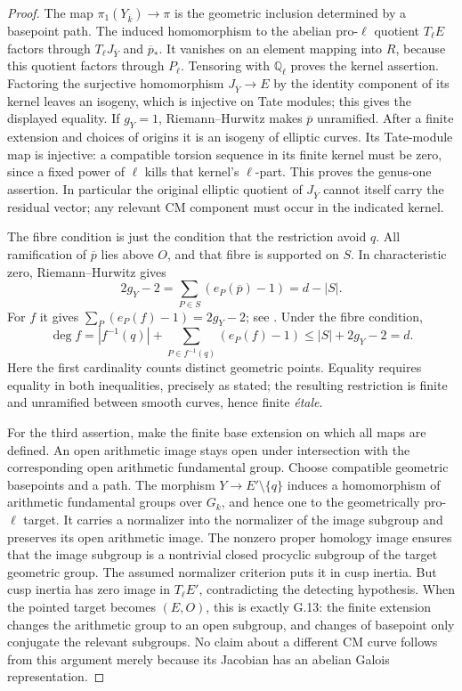 \begin{proof}
The map $\pi_1(Y_{\overline k})\to\pi$ is the geometric
inclusion determined by a basepoint path. The induced homomorphism
to the abelian pro-$\ell$ quotient $T_\ell E$ factors through
$T_\ell J_{\overline Y}$ and $\overline p_*$. It vanishes on
an element mapping into $R$, because this quotient factors
through $P_\ell$. Tensoring with $\mathbb Q_\ell$ proves the
kernel assertion. Factoring
the surjective homomorphism $J_{\overline Y}\to E$ by the
identity component of its kernel leaves an isogeny, which is
injective on Tate modules; this gives the displayed equality.
If $g_Y=1$, Riemann--Hurwitz makes $\overline p$ unramified.
After a finite extension and choices of origins it is an isogeny
of elliptic curves. Its Tate-module map is injective: a compatible
torsion sequence in its finite kernel must be zero, since a
fixed power of $\ell$ kills that kernel's $\ell$-part. This
proves the genus-one assertion. In particular the original
elliptic quotient of $J_{\overline Y}$ cannot itself carry the
residual vector; any relevant CM component must occur in the
indicated kernel.

The fibre condition is just the condition that the restriction
avoid $q$. All ramification of $\overline p$ lies above $O$,
and that fibre is supported on $S$. In characteristic zero,
Riemann--Hurwitz gives
\[
 2g_Y-2=\sum_{P\in S}(e_P(\overline p)-1)=d-|S|.
\]
For $f$ it gives $\sum_P(e_P(f)-1)=2g_Y-2$; see
\citet[\S53.12, Lemmas 53.12.2 and 53.12.4]{GStacksRiemannHurwitz}.
Under the fibre condition,
\[
 \deg f
   =|f^{-1}(q)|+\sum_{P\in f^{-1}(q)}(e_P(f)-1)
   \le |S|+2g_Y-2=d.
\]
Here the first cardinality counts distinct geometric points.
Equality requires equality in both inequalities, precisely as
stated; the resulting restriction is finite and unramified
between smooth curves, hence finite \emph{\'etale}.

For the third assertion, make the finite base extension on which
all maps are defined. An open arithmetic image stays open under
intersection with the corresponding open arithmetic fundamental
group. Choose compatible geometric basepoints and a path. The
morphism $Y\to E'\setminus\{q\}$ induces a homomorphism of
arithmetic fundamental groups over $G_k$, and hence one to the
geometrically pro-$\ell$ target. It carries a normalizer into
the normalizer of the image subgroup and preserves its open
arithmetic image. The nonzero proper homology image ensures
that the image subgroup is a nontrivial closed procyclic
subgroup of the target geometric group. The assumed normalizer
criterion puts it in cusp inertia. But cusp inertia has zero
image in $T_\ell E'$, contradicting the detecting hypothesis.
When the pointed target becomes $(E,O)$, this is exactly G.13:
the finite extension changes the arithmetic group to an open
subgroup, and changes of basepoint only conjugate the relevant
subgroups. No claim about a different CM curve follows from
this argument merely because its Jacobian has an abelian
Galois representation.


\end{proof}
